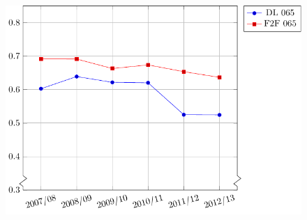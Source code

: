 \begin{figure}[!htb]
\begin{minipage}{.3\textwidth}
          \includegraphics[width=\textwidth]{graphics/passRatesByModality065.pdf}
    \end{minipage}


\end{figure}
